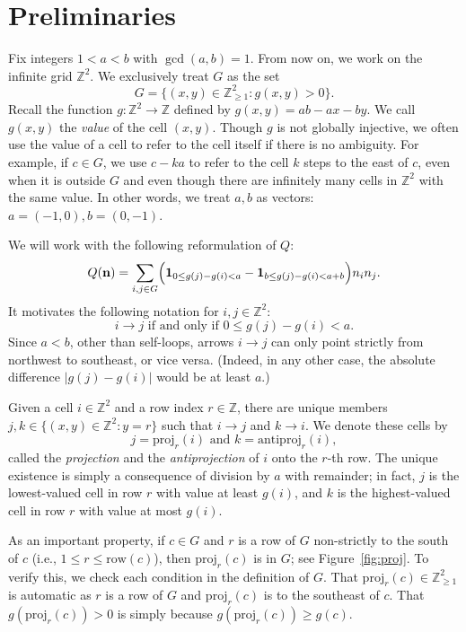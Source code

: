 \documentclass[11pt,reqno]{amsart}
\theoremstyle{remark}
\begin{document}
\section{Preliminaries}
Fix integers $1<a<b$ with $\gcd(a,b)=1$. From now on, we work on the infinite grid $\mathbb{Z}^2$. We exclusively treat $G$ as the set
\begin{equation*}
    G=\{(x,y)\in \mathbb{Z}_{\geq 1}^2:g(x,y)>0\}.
\end{equation*}
Recall the function $g:\mathbb{Z}^2\to \mathbb{Z}$ defined by $g(x,y)=ab-ax-by$. We call $g(x,y)$ the \emph{value} of the cell $(x,y)$. Though $g$ is not globally injective, we often use the value of a cell to refer to the cell itself if there is no ambiguity. For example, if $c\in G$, we use $c-ka$ to refer to the cell $k$ steps to the east of $c$, even when it is outside $G$ and even though there are infinitely many cells in $\mathbb{Z}^2$ with the same value. In other words, we treat $a,b$ as vectors: $a=(-1,0), b=(0,-1)$.

We will work with the following reformulation of $Q$:
\[
Q(\mathbf{n})=\sum_{i,j\in G} \Bigl(\mathbf{1}_{0\le g(j)-g(i)<a}-\mathbf{1}_{b\le g(j)-g(i)<a+b}\Bigr)n_i n_j.
\]
It motivates the following notation for $i,j\in \mathbb{Z}^2$:
\[ i\to j \text{ if and only if }0\leq g(j)-g(i)<a.\]
Since $a<b$, other than self-loops, arrows $i\to j$ can only point strictly from northwest to southeast, or vice versa. (Indeed, in any other case, the absolute difference $|g(j)-g(i)|$ would be at least $a$.)

Given a cell $i\in \mathbb{Z}^2$ and a row index $r\in \mathbb{Z}$, there are unique members $j,k\in \{(x,y)\in \mathbb{Z}^2:y=r\}$ such that $i\to j$ and $k\to i$. We denote these cells by 
\[ j=\mathrm{proj}_r(i) \text{ and } k=\mathrm{antiproj}_r(i),\]
called the \emph{projection} and the \emph{antiprojection} of $i$ onto the $r$-th row. The unique existence is simply a consequence of division by $a$ with remainder; in fact, $j$ is the lowest-valued cell in row $r$ with value at least $g(i)$, and $k$ is the highest-valued cell in row $r$ with value at most $g(i)$.

As an important property, if $c\in G$ and $r$ is a row of $G$ non-strictly to the south of $c$ (i.e., $1\leq r \le \mathrm{row}(c)$), then $\mathrm{proj}_r(c)$ is in $G$; see Figure~\ref{fig:proj}. To verify this, we check each condition in the definition of $G$. That $\mathrm{proj}_r(c) \in \mathbb{Z}_{\geq 1}^2$ is automatic as $r$ is a row of $G$ and $\mathrm{proj}_r(c)$ is to the southeast of $c$. That $g(\mathrm{proj}_r(c))>0$ is simply because $g(\mathrm{proj}_r(c))\ge g(c)$.
\end{document}

